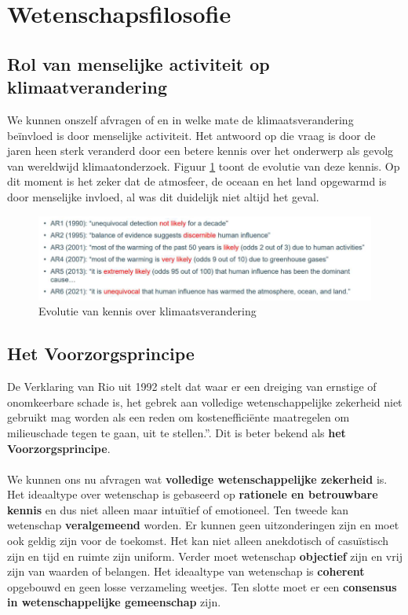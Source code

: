 \documentclass[../summary.tex]{subfiles}
\begin{document}
	
	\section{Wetenschapsfilosofie}
	
	\subsection{Rol van menselijke activiteit op klimaatverandering}
	
	We kunnen onszelf afvragen of en in welke mate de klimaatsverandering beïnvloed is door menselijke activiteit. Het antwoord op die vraag is door de jaren heen sterk veranderd door een betere kennis over het onderwerp als gevolg van wereldwijd klimaatonderzoek. Figuur \ref{fig:progressive-understanding-climate-change} toont de evolutie van deze kennis. Op dit moment is het zeker dat de atmosfeer, de oceaan en het land opgewarmd is door menselijke invloed, al was dit duidelijk niet altijd het geval.
	
	\begin{figure} [htbp]
		\centering
		\includegraphics[width=1\linewidth]{images/progressive-understanding-climate-change.png}
		\caption{Evolutie van kennis over klimaatsverandering}
		\label{fig:progressive-understanding-climate-change}
	\end{figure}
	
	\subsection{Het Voorzorgsprincipe}
	
	De Verklaring van Rio uit 1992 stelt dat waar er een dreiging van ernstige of onomkeerbare schade is, het gebrek aan volledige wetenschappelijke zekerheid niet gebruikt mag worden als een reden om kostenefficiënte maatregelen om milieuschade tegen te gaan, uit te stellen.”. Dit is beter bekend als \textbf{het Voorzorgsprincipe}.
	\\\\
	We kunnen ons nu afvragen wat \textbf{volledige wetenschappelijke zekerheid} is. Het ideaaltype over wetenschap is gebaseerd op \textbf{rationele en betrouwbare kennis} en dus niet alleen maar intuïtief of emotioneel. Ten tweede kan wetenschap \textbf{veralgemeend} worden. Er kunnen geen uitzonderingen zijn en moet ook geldig zijn voor de toekomst. Het kan niet alleen anekdotisch of casuïstisch zijn en tijd en ruimte zijn uniform. Verder moet wetenschap \textbf{objectief} zijn en vrij zijn van waarden of belangen. Het ideaaltype van wetenschap is \textbf{coherent} opgebouwd en geen losse verzameling weetjes. Ten slotte moet er een \textbf{consensus in wetenschappelijke gemeenschap} zijn.
	
\end{document}
